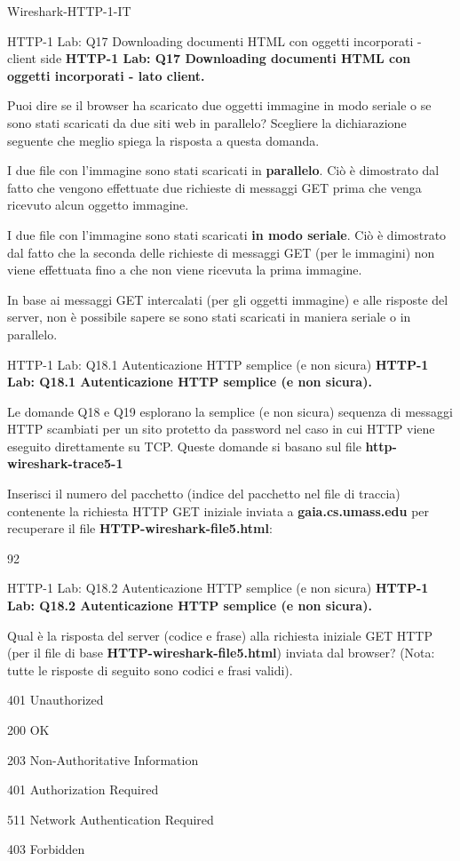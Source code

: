\documentclass[a4paper]{article}
\begin{document}
\begin{quiz}{Wireshark-HTTP-1-IT}
\begin{multi}[points=1,shuffle]{HTTP-1 Lab: Q17 Downloading documenti HTML con oggetti incorporati - client side}
\textbf{HTTP-1 Lab: Q17 Downloading documenti HTML con oggetti incorporati - lato client.} 

Puoi dire se il browser ha scaricato due oggetti immagine in modo seriale o se sono stati scaricati da due siti web in parallelo? 
Scegliere la dichiarazione seguente che meglio spiega la risposta a questa domanda.  
\item I due file con l'immagine sono stati scaricati in \textbf{parallelo}. Ciò è dimostrato dal fatto che vengono effettuate due richieste di messaggi GET prima che venga ricevuto alcun oggetto immagine.
\item* I due file con l'immagine sono stati scaricati \textbf{in modo seriale}. Ciò è dimostrato dal fatto che la seconda delle richieste di messaggi GET (per le immagini) non viene effettuata fino a che non viene ricevuta la prima immagine. 
\item In base ai messaggi GET intercalati (per gli oggetti immagine) e alle risposte del server, non è possibile sapere se sono stati scaricati in maniera seriale o in parallelo.
\end{multi}

\begin{shortanswer}[points=1] {HTTP-1 Lab: Q18.1 Autenticazione HTTP semplice (e non sicura)}
\textbf{HTTP-1 Lab: Q18.1 Autenticazione HTTP semplice (e non sicura).}

Le domande Q18 e Q19 esplorano la semplice (e non sicura) sequenza di messaggi HTTP scambiati per un sito protetto da password nel caso in cui HTTP viene eseguito direttamente su TCP. Queste domande si basano sul file \textbf{http-wireshark-trace5-1}

Inserisci il numero del pacchetto (indice del pacchetto nel file di traccia) contenente la richiesta HTTP GET iniziale inviata a \textbf{gaia.cs.umass.edu} per recuperare il file \textbf{HTTP-wireshark-file5.html}:
\item 92
\end{shortanswer}

\begin{multi}[points=1,shuffle]{HTTP-1 Lab: Q18.2 Autenticazione HTTP semplice (e non sicura)}
\textbf{HTTP-1 Lab: Q18.2 Autenticazione HTTP semplice (e non sicura).}

Qual è la risposta del server (codice e frase) alla richiesta iniziale GET HTTP (per il file di base \textbf{HTTP-wireshark-file5.html}) inviata dal browser? 
(Nota: tutte le risposte di seguito sono codici e frasi validi).   
\item* 401 Unauthorized
\item 200 OK
\item 203 Non-Authoritative Information
\item 401 Authorization Required
\item 511 Network Authentication Required
\item 403 Forbidden
\end{multi}


\end{quiz}
\end{document}
